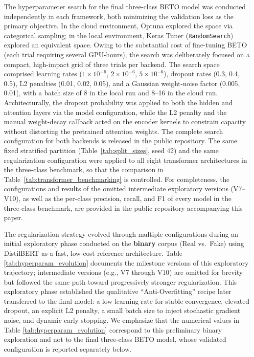 \documentclass[informatics,article,submit,pdftex,moreauthors]{Definitions/mdpi}
\begin{document}
The hyperparameter search for the final three-class BETO model was conducted independently in each framework, both minimizing the validation loss as the primary objective. In the cloud environment, Optuna explored the space via categorical sampling; in the local environment, Keras Tuner (\texttt{RandomSearch}) explored an equivalent space. Owing to the substantial cost of fine-tuning BETO (each trial requiring several GPU-hours), the search was deliberately focused on a compact, high-impact grid of three trials per backend. The search space comprised learning rates ($1 \times 10^{-6}$, $2 \times 10^{-6}$, $5 \times 10^{-6}$), dropout rates (0.3, 0.4, 0.5), L2 penalties (0.01, 0.02, 0.05), and a Gaussian weight-noise factor (0.005, 0.01), with a batch size of 8 in the local run and 8--16 in the cloud run. Architecturally, the dropout probability was applied to both the hidden and attention layers via the model configuration, while the L2 penalty and the manual weight-decay callback acted on the encoder kernels to constrain capacity without distorting the pretrained attention weights. The complete search configuration for both backends is released in the public repository. The same fixed stratified partition (Table~\ref{tab:split_sizes}, seed 42) and the same regularization configuration were applied to all eight transformer architectures in the three-class benchmark, so that the comparison in Table~\ref{tab:transformer_benchmarking} is controlled. For completeness, the configurations and results of the omitted intermediate exploratory versions (V7--V10), as well as the per-class precision, recall, and F1 of every model in the three-class benchmark, are provided in the public repository accompanying this paper.

The regularization strategy evolved through multiple configurations during an initial exploratory phase conducted on the \textbf{binary} corpus (Real vs.\ Fake) using DistilBERT as a fast, low-cost reference architecture. Table \ref{tab:hyperparam_evolution} documents the milestone versions of this exploratory trajectory; intermediate versions (e.g., V7 through V10) are omitted for brevity but followed the same path toward progressively stronger regularization. This exploratory phase established the qualitative ``Anti-Overfitting'' recipe later transferred to the final model: a low learning rate for stable convergence, elevated dropout, an explicit L2 penalty, a small batch size to inject stochastic gradient noise, and dynamic early stopping. We emphasize that the numerical values in Table \ref{tab:hyperparam_evolution} correspond to this preliminary binary exploration and not to the final three-class BETO model, whose validated configuration is reported separately below.
\end{document}
